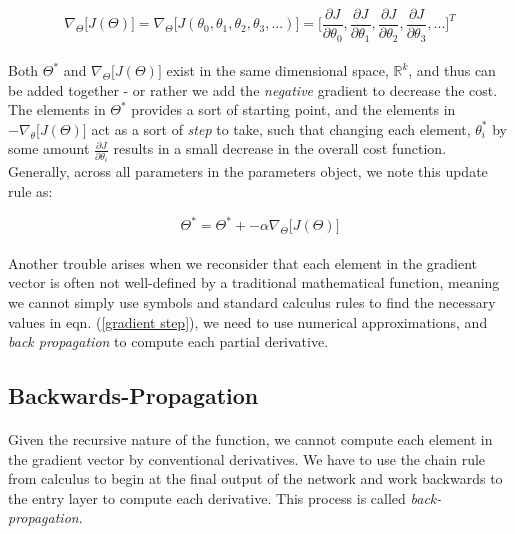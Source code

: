 \documentclass[12pt,letterpaper]{article}
\begin{document}
\begin{equation}
\label{cost gradient}
\nabla_\Theta \big[ J(\Theta) \big] = \nabla_\Theta \big[ J(\theta_0, \theta_1,\theta_2,\theta_3,...) \big] =
\Big[ \frac{\partial J}{\partial \theta_0}, \frac{\partial J}{\partial \theta_1}, 
		\frac{\partial J}{\partial \theta_2}, \frac{\partial J}{\partial \theta_3}, ... \Big]^T
\end{equation}

\paragraph*{}Both $\Theta^*$ and $\nabla_\Theta \big[ J(\Theta) \big]$ exist in the same dimensional space, $\mathbb{R}^k$, and thus can be added together - or rather we add the \textit{negative} gradient to decrease the cost. The elements in $\Theta^*$ provides a sort of starting point, and the elements in $-\nabla_\theta \big[ J(\Theta) \big]$ act as a sort of \textit{step} to take, such that changing each element, $\theta^*_i$ by some amount $\frac{\partial J}{\partial \theta_i}$ results in a small decrease in the overall cost function. Generally, across all parameters in the parameters object, we note this update rule as:

\begin{equation}
\label{gradient step}
\Theta^* = \Theta^* + -\alpha \nabla_\Theta \big[ J(\Theta) \big]
\end{equation}

\paragraph*{}Another trouble arises when we reconsider that each element in the gradient vector is often not well-defined by a traditional mathematical function, meaning we cannot simply use symbols and standard calculus rules to find the necessary values in eqn. (\ref{gradient step}), we need to use numerical approximations, and \textit{back propagation} to compute each partial derivative. 

\subsection{Backwards-Propagation}

\paragraph*{}Given the recursive nature of the function, we cannot compute each element in the gradient vector by conventional derivatives. We have to use the chain rule from calculus to  begin at the final output of the network and work backwards to the entry layer to compute each derivative. This process is called \textit{back-propagation}. 
\end{document}
